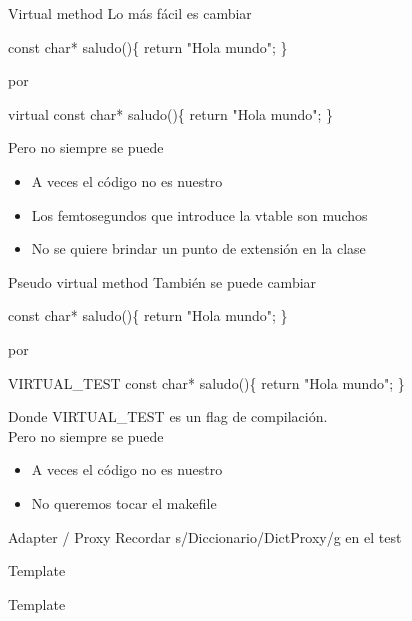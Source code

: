 \begin{frame}[t]{Virtual method}
Lo m\'as f\'acil es cambiar
\begin{center}
  {\color[rgb]{0,1,0}const} {\color[rgb]{1,0,0}char*} saludo()\{ {\color[rgb]{0,1,0}return} {\color[rgb]{0,0,1}"Hola mundo"}; \}
\end{center}
por
\begin{center}
  {\color[rgb]{0,1,0}virtual const} {\color[rgb]{1,0,0}char*} saludo()\{ {\color[rgb]{0,1,0}return} {\color[rgb]{0,0,1}"Hola mundo"}; \}
\end{center}
Pero no siempre se puede
\begin{itemize}
	\item A veces el c\'odigo no es nuestro
	\item Los femtosegundos que introduce la vtable son muchos
	\item No se quiere brindar un punto de extensi\'on en la clase
\end{itemize}
\end{frame}


\begin{frame}[t]{Pseudo virtual method}
Tambi\'en se puede cambiar
\begin{center}
  {\color[rgb]{0,1,0}const} {\color[rgb]{1,0,0}char*} saludo()\{ {\color[rgb]{0,1,0}return} {\color[rgb]{0,0,1}"Hola mundo"}; \}
\end{center}
por
\begin{center}
  {\color[rgb]{0,1,0}VIRTUAL\_TEST const} {\color[rgb]{1,0,0}char*} saludo()\{ {\color[rgb]{0,1,0}return} {\color[rgb]{0,0,1}"Hola mundo"}; \}
\end{center}
Donde VIRTUAL\_TEST es un flag de compilaci\'on. \\
\bigskip
Pero no siempre se puede
\begin{itemize}
	\item A veces el c\'odigo no es nuestro
	\item No queremos tocar el makefile
\end{itemize}
\end{frame}


\begin{frame}[shrink]{Adapter / Proxy}
Recordar {\color[rgb]{0,0,1}s/Diccionario/DictProxy/g} en el test

\end{frame}

\begin{frame}[shrink]{Template}

\end{frame}

\begin{frame}[shrink]{Template}

\end{frame}
